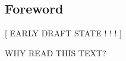 \begin{fmatterchapter}


\chapter*{Foreword}

\begingroup


[ EARLY DRAFT STATE ! ! ! ]

WHY READ THIS TEXT?


\endgroup
\end{fmatterchapter}
